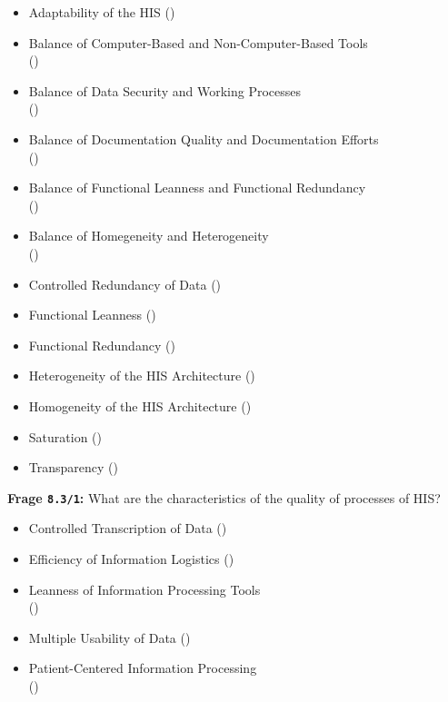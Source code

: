 \begin{itemize}
  \item Adaptability of the HIS ()
  \item Balance of Computer-Based and Non-Computer-Based Tools \\
  ()
  \item Balance of Data Security and Working Processes \\
  ()
  \item Balance of Documentation Quality and Documentation Efforts \\()
  \item Balance of Functional Leanness and Functional Redundancy \\
  ()
  \item Balance of Homegeneity and Heterogeneity \\
  ()
  \item Controlled Redundancy of Data ()
  \item Functional Leanness ()
  \item Functional Redundancy ()
  \item Heterogeneity of the HIS Architecture ()
  \item Homogeneity of the HIS Architecture ()
  \item Saturation ()
  \item Transparency ()
\end{itemize}

\textbf{Frage \texttt{8.3/1}:} What are the characteristics of the quality of processes of HIS?

\begin{itemize}
  \item Controlled Transcription of Data ()
  \item Efficiency of Information Logistics ()
  \item Leanness of Information Processing Tools \\
  ()
  \item Multiple Usability of Data ()
  \item Patient-Centered Information Processing \\
  ()
\end{itemize}

